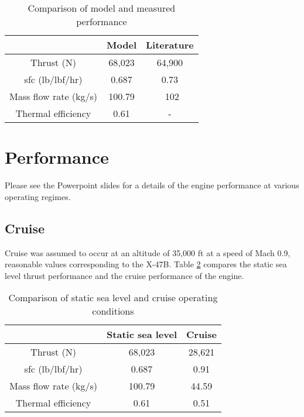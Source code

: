 \documentclass{article}
\begin{document}
\begin{table}
\caption{Comparison of model and measured performance}
\label{tab:comparison}
\begin{center}
\begin{tabular}{c | c | c}
& \textbf{Model} & \textbf{Literature} \\ \hline
Thrust (N) & 68,023 & 64,900 \\
sfc (lb/lbf/hr) & 0.687 & 0.73 \\
Mass flow rate (kg/s) & 100.79 & ~102 \\
Thermal efficiency & 0.61 & - \\
\end{tabular}
\end{center}
\end{table}

\section{Performance}

Please see the Powerpoint slides for a details of the engine performance at various operating regimes.

\subsection{Cruise}

Cruise was assumed to occur at an altitude of 35,000 ft at a speed of Mach 0.9, reasonable values corresponding to the X-47B. Table \ref{tab:compare_SLS_and_cruise} compares the static sea level thrust performance and the cruise performance of the engine.

\begin{table}
\caption{Comparison of static sea level and cruise operating conditions}
\label{tab:compare_SLS_and_cruise}
\begin{center}
\begin{tabular}{c | c | c}
& \textbf{Static sea level} & \textbf{Cruise} \\ \hline
Thrust (N) & 68,023 & 28,621 \\
sfc (lb/lbf/hr) & 0.687 & 0.91 \\
Mass flow rate (kg/s) & 100.79 & 44.59 \\
Thermal efficiency & 0.61 & 0.51 \\
\end{tabular}
\end{center}
\end{table}



\end{document}
